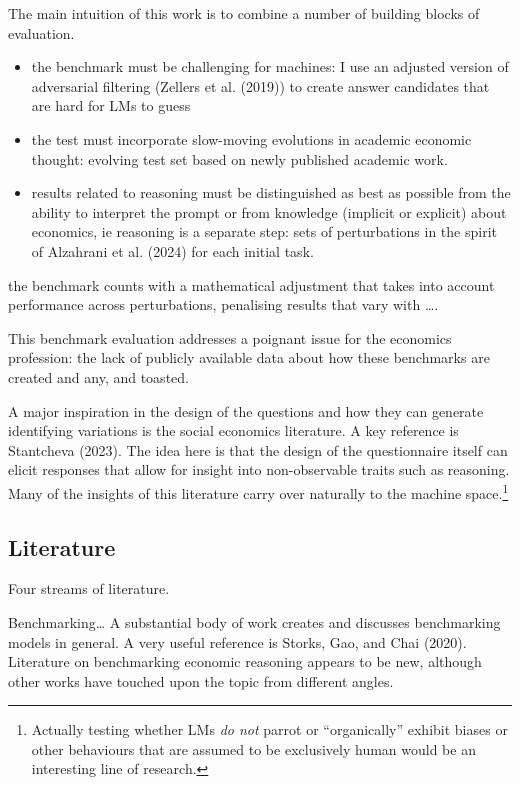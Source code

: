 \documentclass[
]{article}
\begin{document}
The main intuition of this work is to combine a number of building
blocks of evaluation.

\begin{itemize}
\item
  the benchmark must be challenging for machines: I use an adjusted
  version of adversarial filtering (Zellers et al. (2019)) to create
  answer candidates that are hard for LMs to guess
\item
  the test must incorporate slow-moving evolutions in academic economic
  thought: evolving test set based on newly published academic work.
\item
  results related to reasoning must be distinguished as best as possible
  from the ability to interpret the prompt or from knowledge (implicit
  or explicit) about economics, ie reasoning is a separate step: sets of
  perturbations in the spirit of Alzahrani et al. (2024) for each
  initial task.
\end{itemize}

the benchmark counts with a mathematical adjustment that takes into
account performance across perturbations, penalising results that vary
with \ldots.

This benchmark evaluation addresses a poignant issue for the economics
profession: the lack of publicly available data about how these
benchmarks are created and any, and toasted.

A major inspiration in the design of the questions and how they can
generate identifying variations is the social economics literature. A
key reference is Stantcheva (2023). The idea here is that the design of
the questionnaire itself can elicit responses that allow for insight
into non-observable traits such as reasoning. Many of the insights of
this literature carry over naturally to the machine space.\footnote{Actually
  testing whether LMs \emph{do not} parrot or ``organically'' exhibit
  biases or other behaviours that are assumed to be exclusively human
  would be an interesting line of research.}

\hypertarget{literature}{%
\subsection{Literature}\label{literature}}

Four streams of literature.

Benchmarking\ldots{} A substantial body of work creates and discusses
benchmarking models in general. A very useful reference is Storks, Gao,
and Chai (2020). Literature on benchmarking economic reasoning appears
to be new, although other works have touched upon the topic from
different angles.
\end{document}
